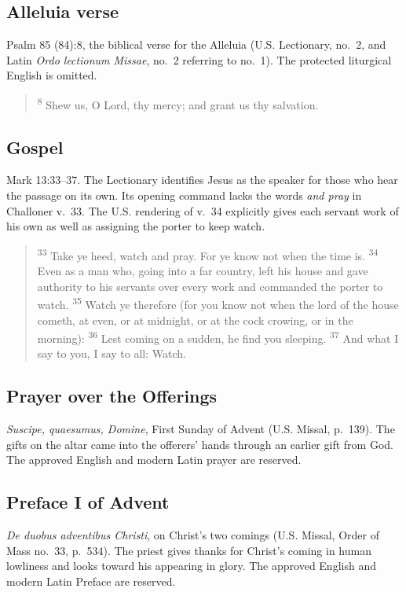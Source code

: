 \subsection{Alleluia verse}
\label{proper-acclamation}
Psalm 85 (84):8, the biblical verse for the Alleluia (U.S. Lectionary, no.~2, and Latin \textit{Ordo lectionum Missae}, no.~2 referring to no.~1). The protected liturgical English is omitted.
\begin{quote}
\textsuperscript{8} Shew us, O Lord, thy mercy; and grant us thy salvation.
\end{quote}

\subsection{Gospel}
\label{proper-gospel}
Mark 13:33--37. The Lectionary identifies Jesus as the speaker for those who hear the passage on its own. Its opening command lacks the words \emph{and pray} in Challoner v.~33. The U.S. rendering of v.~34 explicitly gives each servant work of his own as well as assigning the porter to keep watch.
\begin{quote}
\textsuperscript{33} Take ye heed, watch and pray. For ye know not when the time is.
\textsuperscript{34} Even as a man who, going into a far country, left his house and gave authority to his servants over every work and commanded the porter to watch.
\textsuperscript{35} Watch ye therefore (for you know not when the lord of the house cometh, at even, or at midnight, or at the cock crowing, or in the morning):
\textsuperscript{36} Lest coming on a sudden, he find you sleeping.
\textsuperscript{37} And what I say to you, I say to all: Watch.
\end{quote}

\subsection{Prayer over the Offerings}
\label{proper-offerings}
\textit{Suscipe, quaesumus, Domine}, First Sunday of Advent (U.S. Missal, p.~139). The gifts on the altar came into the offerers' hands through an earlier gift from God. The approved English and modern Latin prayer are reserved.

\subsection{Preface I of Advent}
\label{proper-preface}
\textit{De duobus adventibus Christi}, on Christ's two comings (U.S. Missal, Order of Mass no.~33, p.~534). The priest gives thanks for Christ's coming in human lowliness and looks toward his appearing in glory. The approved English and modern Latin Preface are reserved.

